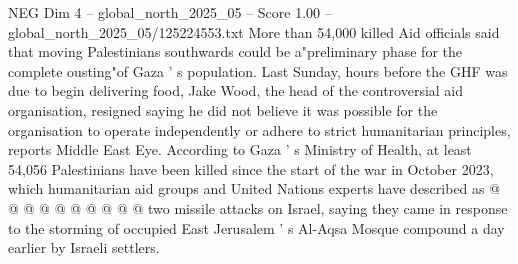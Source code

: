 \begin{textsample}{NEG Dim 4 – global\_north\_2025\_05 – Score 1.00 – global\_north\_2025\_05/125224553.txt}
More than 54,000 killed Aid officials said that moving Palestinians southwards could be a"preliminary phase for the complete ousting"of Gaza ' s population.
Last Sunday, hours before the GHF was due to begin delivering food, Jake Wood, the head of the controversial aid organisation, resigned saying he did not believe it was possible for the organisation to operate independently or adhere to strict humanitarian principles, reports Middle East Eye.
According to Gaza ' s Ministry of Health, at least 54,056 Palestinians have been killed since the start of the war in October 2023, which humanitarian aid groups and United Nations experts have described as @ @ @ @ @ @ @ @ @ @ two missile attacks on Israel, saying they came in response to the storming of occupied East Jerusalem ' s Al-Aqsa Mosque compound a day earlier by Israeli settlers.

\end{textsample}
